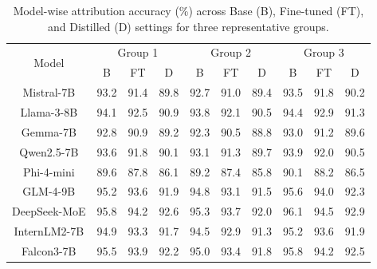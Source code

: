 \begin{table}[h]
\centering
\scriptsize
\setlength{\tabcolsep}{4pt}
\renewcommand{\arraystretch}{1.2}
\begin{tabular}{c|ccc|ccc|ccc}
\hline
\multirow{2}{*}{Model} 
& \multicolumn{3}{c|}{Group 1}
& \multicolumn{3}{c|}{Group 2}
& \multicolumn{3}{c}{Group 3} \\

& B & FT & D
& B & FT & D
& B & FT & D \\
\hline

Mistral-7B 
& 93.2 & 91.4 & 89.8 
& 92.7 & 91.0 & 89.4 
& 93.5 & 91.8 & 90.2 \\

Llama-3-8B 
& 94.1 & 92.5 & 90.9 
& 93.8 & 92.1 & 90.5 
& 94.4 & 92.9 & 91.3 \\

Gemma-7B 
& 92.8 & 90.9 & 89.2 
& 92.3 & 90.5 & 88.8 
& 93.0 & 91.2 & 89.6 \\

Qwen2.5-7B
& 93.6 & 91.8 & 90.1 
& 93.1 & 91.3 & 89.7 
& 93.9 & 92.0 & 90.5 \\

Phi-4-mini
& 89.6 & 87.8 & 86.1 
& 89.2 & 87.4 & 85.8 
& 90.1 & 88.2 & 86.5 \\

GLM-4-9B
& 95.2 & 93.6 & 91.9
& 94.8 & 93.1 & 91.5
& 95.6 & 94.0 & 92.3 \\

DeepSeek-MoE
& 95.8 & 94.2 & 92.6
& 95.3 & 93.7 & 92.0
& 96.1 & 94.5 & 92.9 \\

InternLM2-7B
& 94.9 & 93.3 & 91.7
& 94.5 & 92.9 & 91.3
& 95.2 & 93.6 & 91.9 \\

Falcon3-7B
& 95.5 & 93.9 & 92.2
& 95.0 & 93.4 & 91.8
& 95.8 & 94.2 & 92.5 \\

\hline
\end{tabular}
\caption{Model-wise attribution accuracy (\%) across Base (B), Fine-tuned (FT), and Distilled (D) settings for three representative groups.}
\label{tab:model_wise_attribution}
\end{table}




